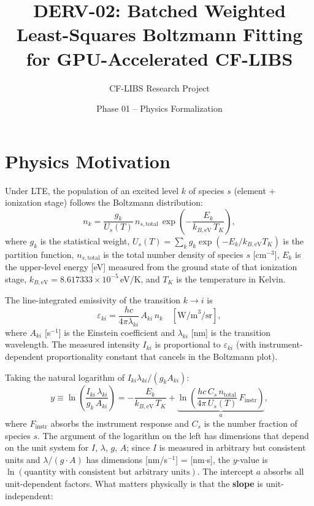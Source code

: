 \documentclass[11pt]{article}
\title{DERV-02: Batched Weighted Least-Squares Boltzmann Fitting\\
       for GPU-Accelerated CF-LIBS}
\author{CF-LIBS Research Project}
\date{Phase 01 -- Physics Formalization}
\newcommand{\kbeV}{k_{B,\text{eV}}}
\begin{document}
\maketitle

\section{Physics Motivation}
\label{sec:motivation}

Under LTE, the population of an excited level $k$ of species $s$ (element + ionization stage)
follows the Boltzmann distribution:
\begin{equation}
  n_k = \frac{g_k}{U_s(T)}\,n_{s,\text{total}}\,\exp\!\left(-\frac{E_k}{\kbeV\,T_K}\right),
  \label{eq:boltzmann_pop}
\end{equation}
where $g_k$ is the statistical weight, $U_s(T) = \sum_k g_k \exp(-E_k/\kbeV T_K)$
is the partition function, $n_{s,\text{total}}$ is the total number density of species $s$
[cm$^{-3}$], $E_k$ is the upper-level energy [eV] measured from the ground state
of that ionization stage, $\kbeV = 8.617333 \times 10^{-5}$\,eV/K, and $T_K$ is
the temperature in Kelvin.

The line-integrated emissivity of the transition $k \to i$ is
\begin{equation}
  \varepsilon_{ki} = \frac{hc}{4\pi\lambda_{ki}}\,A_{ki}\,n_k
  \quad [\text{W/m}^3\text{/sr}],
  \label{eq:emissivity}
\end{equation}
where $A_{ki}$ [s$^{-1}$] is the Einstein coefficient and $\lambda_{ki}$ [nm] is the
transition wavelength. The measured intensity $I_{ki}$ is proportional to $\varepsilon_{ki}$
(with instrument-dependent proportionality constant that cancels in the Boltzmann plot).

Taking the natural logarithm of $I_{ki}\lambda_{ki}/(g_k A_{ki})$:
\begin{equation}
  \boxed{y \equiv \ln\!\left(\frac{I_{ki}\,\lambda_{ki}}{g_k\,A_{ki}}\right)
  = -\frac{E_k}{\kbeV\,T_K} + \underbrace{\ln\!\left(\frac{hc\,C_s\,n_{\text{total}}}{4\pi\,U_s(T)}\,F_{\text{instr}}\right)}_{\displaystyle a},}
  \label{eq:boltzmann_plot}
\end{equation}
where $F_{\text{instr}}$ absorbs the instrument response and $C_s$ is the
number fraction of species $s$. The argument of the logarithm on the left
has dimensions that depend on the unit system for $I$, $\lambda$, $g$, $A$;
since $I$ is measured in arbitrary but consistent units and $\lambda/(g\cdot A)$
has dimensions [nm/s$^{-1}$] = [nm$\cdot$s], the $y$-value is
$\ln(\text{quantity with consistent but arbitrary units})$. The intercept $a$
absorbs all unit-dependent factors. What matters physically is that the
\textbf{slope} is unit-independent:
\end{document}
